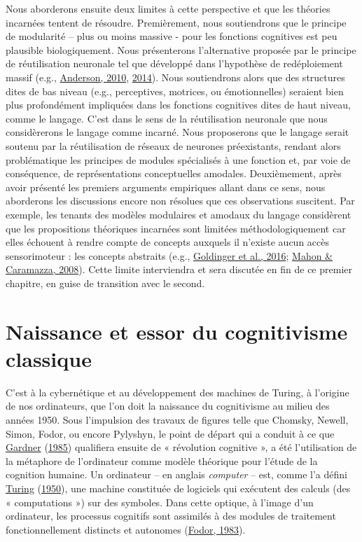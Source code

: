 \documentclass[
  a4paper,12pt,twoside,onecolumn,openright,final,oldfontcommands]{memoir}
\begin{document}
Nous aborderons ensuite deux limites à cette perspective et que les théories incarnées tentent de résoudre. Premièrement, nous soutiendrons que le principe de modularité -- plus ou moins massive - pour les fonctions cognitives est peu plausible biologiquement. Nous présenterons l'alternative proposée par le principe de réutilisation neuronale tel que développé dans l'hypothèse de redéploiement massif (e.g., \protect\hyperlink{ref-anderson_neural_2010}{Anderson, 2010}, \protect\hyperlink{ref-anderson_after_2014}{2014}). Nous soutiendrons alors que des structures dites de bas niveau (e.g., perceptives, motrices, ou émotionnelles) seraient bien plus profondément impliquées dans les fonctions cognitives dites de haut niveau, comme le langage. C'est dans le sens de la réutilisation neuronale que nous considèrerons le langage comme incarné. Nous proposerons que le langage serait soutenu par la réutilisation de réseaux de neurones préexistants, rendant alors problématique les principes de modules spécialisés à une fonction et, par voie de conséquence, de représentations conceptuelles amodales. Deuxièmement, après avoir présenté les premiers arguments empiriques allant dans ce sens, nous aborderons les discussions encore non résolues que ces observations suscitent. Par exemple, les tenants des modèles modulaires et amodaux du langage considèrent que les propositions théoriques incarnées sont limitées méthodologiquement car elles échouent à rendre compte de concepts auxquels il n'existe aucun accès sensorimoteur : les concepts abstraits (e.g., \protect\hyperlink{ref-goldinger_poverty_2016}{Goldinger et al., 2016}; \protect\hyperlink{ref-mahon_critical_2008}{Mahon \& Caramazza, 2008}). Cette limite interviendra et sera discutée en fin de ce premier chapitre, en guise de transition avec le second.

\hypertarget{naissance-et-essor-du-cognitivisme-classique}{%
\section{Naissance et essor du cognitivisme classique}\label{naissance-et-essor-du-cognitivisme-classique}}

C'est à la cybernétique et au développement des machines de Turing, à l'origine de nos ordinateurs, que l'on doit la naissance du cognitivisme au milieu des années 1950. Sous l'impulsion des travaux de figures telle que Chomsky, Newell, Simon, Fodor, ou encore Pylyshyn, le point de départ qui a conduit à ce que \protect\hyperlink{ref-gardner_minds_1985}{Gardner} (\protect\hyperlink{ref-gardner_minds_1985}{1985}) qualifiera ensuite de « révolution cognitive », a été l'utilisation de la métaphore de l'ordinateur comme modèle théorique pour l'étude de la cognition humaine. Un ordinateur -- en anglais \emph{computer} -- est, comme l'a défini \protect\hyperlink{ref-turing_computing_1950}{Turing} (\protect\hyperlink{ref-turing_computing_1950}{1950}), une machine constituée de logiciels qui exécutent des calculs (des « computations ») sur des symboles. Dans cette optique, à l'image d'un ordinateur, les processus cognitifs sont assimilés à des modules de traitement fonctionnellement distincts et autonomes (\protect\hyperlink{ref-fodor_modularity_1983}{Fodor, 1983}).
\end{document}

